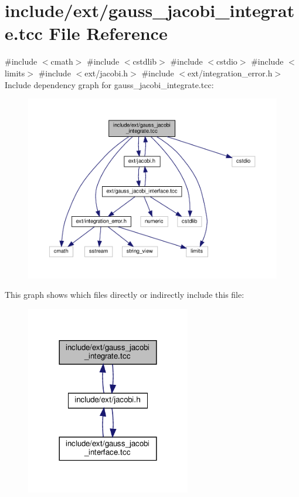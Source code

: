\hypertarget{gauss__jacobi__integrate_8tcc}{}\section{include/ext/gauss\+\_\+jacobi\+\_\+integrate.tcc File Reference}
\label{gauss__jacobi__integrate_8tcc}
{\ttfamily \#include $<$cmath$>$}\newline
{\ttfamily \#include $<$cstdlib$>$}\newline
{\ttfamily \#include $<$cstdio$>$}\newline
{\ttfamily \#include $<$limits$>$}\newline
{\ttfamily \#include $<$ext/jacobi.\+h$>$}\newline
{\ttfamily \#include $<$ext/integration\+\_\+error.\+h$>$}\newline
Include dependency graph for gauss\+\_\+jacobi\+\_\+integrate.\+tcc\+:
\nopagebreak
\begin{figure}[H]
\begin{center}
\leavevmode
\includegraphics[width=350pt]{gauss__jacobi__integrate_8tcc__incl}
\end{center}
\end{figure}
This graph shows which files directly or indirectly include this file\+:
\nopagebreak
\begin{figure}[H]
\begin{center}
\leavevmode
\includegraphics[width=204pt]{gauss__jacobi__integrate_8tcc__dep__incl}
\end{center}
\end{figure}
